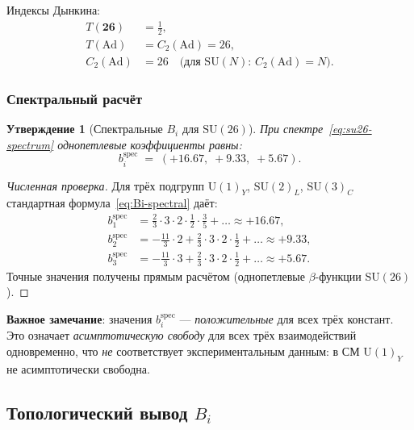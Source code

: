 \documentclass[11pt,a4paper]{article}
\newcommand{\SU}{\ensuremath{\mathrm{SU}}}
\newcommand{\Ad}{\ensuremath{\mathrm{Ad}}}
\newtheorem{proposition}[theorem]{Утверждение}
\theoremstyle{definition}
\begin{document}
\medskip\noindent
Индексы Дынкина:
\begin{align}
    T(\mathbf{26}) &= \frac{1}{2}, \\
    T(\Ad) &= C_2(\Ad) = 26, \\
    C_2(\Ad) &= 26 \quad \text{(для $\SU(N)$: $C_2(\Ad) = N$)}.
\end{align}

\subsubsection{Спектральный расчёт}

\begin{proposition}[Спектральные $B_i$ для $\SU(26)$]
\label{prop:bi-spectral-su26}
При спектре~\eqref{eq:su26-spectrum} однопетлевые коэффициенты
равны:
\begin{equation}
    b_i^{\text{spec}} \;=\; (+16.67,\; +9.33,\; +5.67).
    \label{eq:bi-spectral-su26}
\end{equation}
\end{proposition}

\begin{proof}[Численная проверка]
Для трёх подгрупп $\mathrm{U}(1)_Y$, $\mathrm{SU}(2)_L$,
$\mathrm{SU}(3)_C$ стандартная формула~\eqref{eq:Bi-spectral}
даёт:
\begin{align}
    b_1^{\text{spec}} &= \frac{2}{3} \cdot 3 \cdot 2 \cdot \frac{1}{2}
    \cdot \frac{3}{5} + \ldots \approx +16.67, \\
    b_2^{\text{spec}} &= -\frac{11}{3} \cdot 2
    + \frac{2}{3} \cdot 3 \cdot 2 \cdot \frac{1}{2} + \ldots
    \approx +9.33, \\
    b_3^{\text{spec}} &= -\frac{11}{3} \cdot 3
    + \frac{2}{3} \cdot 3 \cdot 2 \cdot \frac{1}{2} + \ldots
    \approx +5.67.
\end{align}
Точные значения получены прямым расчётом
(однопетлевые $\beta$-функции $\SU(26)$).
\end{proof}

\medskip\noindent
\textbf{Важное замечание}: значения $b_i^{\text{spec}}$
--- \emph{положительные} для всех трёх констант. Это означает
\emph{асимптотическую свободу} для всех трёх взаимодействий
одновременно, что \emph{не} соответствует экспериментальным
данным: в СМ $\mathrm{U}(1)_Y$ не асимптотически свободна.

\subsection{Топологический вывод \texorpdfstring{$B_i$}{B\_i}}
\label{subsec:bi-topological}
\end{document}
